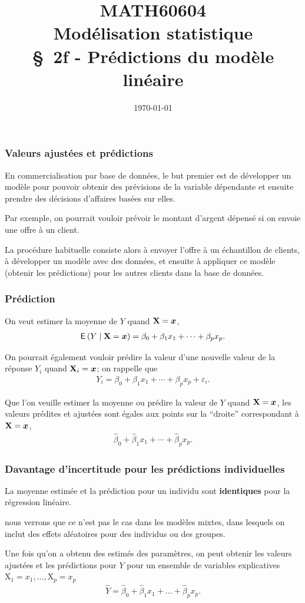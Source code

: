 \documentclass[xcolor={dvipsnames}]{beamer}
\title[\color{white}{MATH60604 \S~2f - Prédictions du modèle linéaire}]{MATH60604 \\Modélisation statistique \\ \S~2f - Prédictions du modèle linéaire}
\author{}
\date{\today}
\institute{HEC Montréal\\
Département de sciences de la décision}
\date{}
\begin{document}
\frame{\titlepage}

\begin{frame}
\frametitle{Valeurs ajustées et prédictions}
\bi
\item En commercialisation par base de données, le but
premier est de développer un modèle pour pouvoir obtenir des prévisions
de la variable dépendante et ensuite prendre des décisions d’affaires basées
sur elles.
\item 
Par exemple, on pourrait vouloir prévoir le montant d’argent dépensé si on
envoie une offre à un client.
\item La procédure habituelle consiste alors à envoyer l’offre à un échantillon de clients, à développer un modèle avec des données, et ensuite à appliquer ce modèle (obtenir les prédictions) pour les autres clients dans la base de
données.
\ei
\end{frame}



\begin{frame}
\frametitle{Prédiction}
\bi
\item On veut estimer la \alert{moyenne de $Y$} quand $\mathbf{X}=\boldsymbol {x}$,
\begin{align*}
{\mathsf E}_{}\left(Y\mid \mathbf{X}=\boldsymbol {x}\right)=\beta_0+\beta_1x_1 + \cdots + \beta_px_p.\end{align*}
\item On pourrait également vouloir \alert{prédire la valeur} d'une nouvelle valeur de la réponse $Y_i$ quand $\mathbf{X}_i=\boldsymbol {x}$; on rappelle que
\begin{align*}
Y_i=\beta_0+\beta_1x_1 + \cdots + \beta_px_p +\varepsilon_i.
\end{align*}
\item Que l'on veuille estimer la \alert{moyenne} ou prédire la \alert{valeur} de $Y$ quand $\mathbf{X}=\boldsymbol {x}$, les valeurs prédites et ajustées sont égales aux points sur la ``droite'' correspondant à $\mathbf{X}=\boldsymbol {x}$,
\begin{align*}
\hat{\beta}_0+\hat{\beta}_1x_{1} + \cdots + \hat{\beta}_px_{p}.
\end{align*}

\ei
\end{frame}
\begin{frame}
\frametitle{Davantage d'incertitude pour les prédictions individuelles}
\bi 
\item La moyenne estimée et la prédiction pour un individu sont \textbf{identiques} pour la régression linéaire.
\bi \item nous verrons que ce n'est pas le cas dans les modèles mixtes, dans lesquels on inclut des effets aléatoires pour des individus ou des groupes.
\ei
\item Une fois qu'on a obtenu des estimés des paramètres, on peut obtenir les valeurs ajustées et les prédictions pour
$Y$ pour un ensemble de variables explicatives $\mathrm{X}_1=x_1, \ldots,\mathrm{X}_p=x_p$
\begin{align*}
\hat{Y}=\hat{\beta}_0 +\hat{\beta}_1 x_1+\ldots+\hat{\beta}_px_p.
\end{align*}
\ei
\end{frame}
\end{document}
